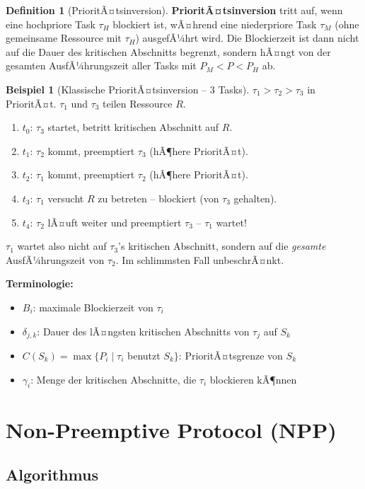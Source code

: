 ﻿\documentclass[a4paper,12pt]{report}
\theoremstyle{definition}
\newtheorem{definition}{Definition}[chapter]
\newtheorem{beispiel}{Beispiel}[chapter]
\begin{document}
\begin{definition}[PrioritÃ¤tsinversion]
	\textbf{PrioritÃ¤tsinversion} tritt auf, wenn eine hochpriore Task $\tau_H$
	blockiert ist, wÃ¤hrend eine niederpriore Task $\tau_M$ (ohne gemeinsame
	Ressource mit $\tau_H$) ausgefÃ¼hrt wird. Die Blockierzeit ist dann nicht
	auf die Dauer des kritischen Abschnitts begrenzt, sondern hÃ¤ngt von der
	gesamten AusfÃ¼hrungszeit aller Tasks mit $P_M < P < P_H$ ab.
\end{definition}

\begin{beispiel}[Klassische PrioritÃ¤tsinversion -- 3 Tasks]
	$\tau_1 > \tau_2 > \tau_3$ in PrioritÃ¤t. $\tau_1$ und $\tau_3$ teilen Ressource $R$.
	\begin{enumerate}
		\item $t_0$: $\tau_3$ startet, betritt kritischen Abschnitt auf $R$.
		\item $t_1$: $\tau_2$ kommt, preemptiert $\tau_3$ (hÃ¶here PrioritÃ¤t).
		\item $t_2$: $\tau_1$ kommt, preemptiert $\tau_2$ (hÃ¶here PrioritÃ¤t).
		\item $t_3$: $\tau_1$ versucht $R$ zu betreten -- blockiert (von $\tau_3$ gehalten).
		\item $t_4$: $\tau_2$ lÃ¤uft weiter und preemptiert $\tau_3$ -- $\tau_1$ wartet!
	\end{enumerate}
	$\tau_1$ wartet also nicht auf $\tau_3$'s kritischen Abschnitt, sondern auf die
	\emph{gesamte} AusfÃ¼hrungszeit von $\tau_2$. Im schlimmsten Fall unbeschrÃ¤nkt.
\end{beispiel}

\textbf{Terminologie:}
\begin{itemize}
	\item $B_i$: maximale Blockierzeit von $\tau_i$
	\item $\delta_{j,k}$: Dauer des lÃ¤ngsten kritischen Abschnitts von $\tau_j$ auf $S_k$
	\item $C(S_k) = \max\{P_i \mid \tau_i$ benutzt $S_k\}$: PrioritÃ¤tsgrenze von $S_k$
	\item $\gamma_i$: Menge der kritischen Abschnitte, die $\tau_i$ blockieren kÃ¶nnen
\end{itemize}

\section{Non-Preemptive Protocol (NPP)}

\subsection{Algorithmus}
\end{document}
